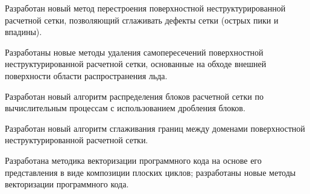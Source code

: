 \item Разработан новый метод перестроения поверхностной неструктурированной расчетной сетки, позволяющий сглаживать дефекты сетки (острых пики и впадины).
\item Разработаны новые методы удаления самопересечений поверхностной неструктурированной расчетной сетки, основанные на обходе внешней поверхности области распространения льда.
\item Разработан новый алгоритм распределения блоков расчетной сетки по вычислительным процессам с использованием дробления блоков.
\item Разработан новый алгоритм сглаживания границ между доменами поверхностной неструктурированной расчетной сетки.
\item Разработана методика векторизации программного кода на основе его представления в виде композиции плоских циклов; разработаны новые методы векторизации программного кода.